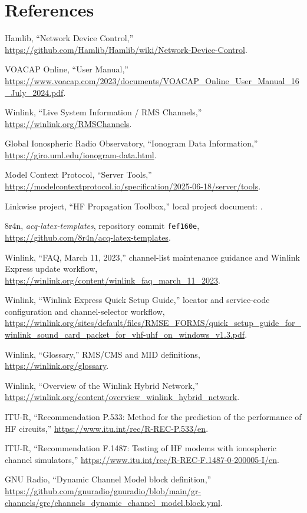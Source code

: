 \documentclass[11pt,a4paper]{article}
\begin{document}
\section{References}
\begin{enumerate}[label={[\arabic*]}]
  \item Hamlib, “Network Device Control,” \url{https://github.com/Hamlib/Hamlib/wiki/Network-Device-Control}.
  \item VOACAP Online, “User Manual,” \url{https://www.voacap.com/2023/documents/VOACAP_Online_User_Manual_16_July_2024.pdf}.
  \item Winlink, “Live System Information / RMS Channels,” \url{https://winlink.org/RMSChannels}.
  \item Global Ionospheric Radio Observatory, “Ionogram Data Information,” \url{https://giro.uml.edu/ionogram-data.html}.
  \item Model Context Protocol, “Server Tools,” \url{https://modelcontextprotocol.io/specification/2025-06-18/server/tools}.
  \item Linkwise project, “HF Propagation Toolbox,” local project document: .
  \item 8r4n, \emph{acq-latex-templates}, repository commit \texttt{fef160e}, \url{https://github.com/8r4n/acq-latex-templates}.
  \item Winlink, “FAQ, March 11, 2023,” channel-list maintenance guidance and Winlink Express update workflow, \url{https://winlink.org/content/winlink_faq_march_11_2023}.
  \item Winlink, “Winlink Express Quick Setup Guide,” locator and service-code configuration and channel-selector workflow, \url{https://winlink.org/sites/default/files/RMSE_FORMS/quick_setup_guide_for_winlink_sound_card_packet_for_vhf-uhf_on_windows_v1.3.pdf}.
  \item Winlink, “Glossary,” RMS/CMS and MID definitions, \url{https://winlink.org/glossary}.
  \item Winlink, “Overview of the Winlink Hybrid Network,” \url{https://winlink.org/content/overview_winlink_hybrid_network}.
  \item ITU-R, “Recommendation P.533: Method for the prediction of the performance of HF circuits,” \url{https://www.itu.int/rec/R-REC-P.533/en}.
  \item ITU-R, “Recommendation F.1487: Testing of HF modems with ionospheric channel simulators,” \url{https://www.itu.int/rec/R-REC-F.1487-0-200005-I/en}.
  \item GNU Radio, “Dynamic Channel Model block definition,” \url{https://github.com/gnuradio/gnuradio/blob/main/gr-channels/grc/channels_dynamic_channel_model.block.yml}.

\end{enumerate}
\end{document}
